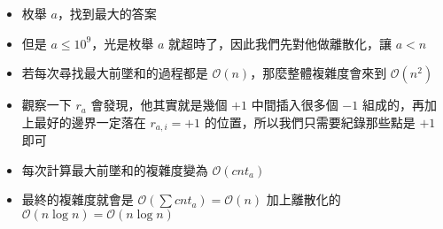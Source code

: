 \documentclass[aspectratio=169]{beamer}
\begin{document}
    \begin{frame}
    		\begin{itemize}
    			\item 枚舉 $a$，找到最大的答案
    			\item 但是 $a \le 10^9$，光是枚舉 $a$ 就超時了，因此我們先對他做離散化，讓 $a < n$
    			\item 若每次尋找最大前墜和的過程都是 $\mathcal{O}(n)$，那麼整體複雜度會來到 $\mathcal{O}(n^2)$
    			\item 觀察一下 $r_a$ 會發現，他其實就是幾個 $+1$ 中間插入很多個 $-1$ 組成的，再加上最好的邊界一定落在 $r_{a,i}=+1$ 的位置，所以我們只需要紀錄那些點是 $+1$ 即可
    			\item 每次計算最大前墜和的複雜度變為 $\mathcal{O}(cnt_a)$
    			\item 最終的複雜度就會是 $\mathcal{O}(\displaystyle\sum{cnt_{a}}) = \mathcal{O}(n)$ 加上離散化的 $\mathcal{O}(n\log n) = \mathcal{O}(n\log n)$
    		\end{itemize}
    \end{frame}
\end{document}
